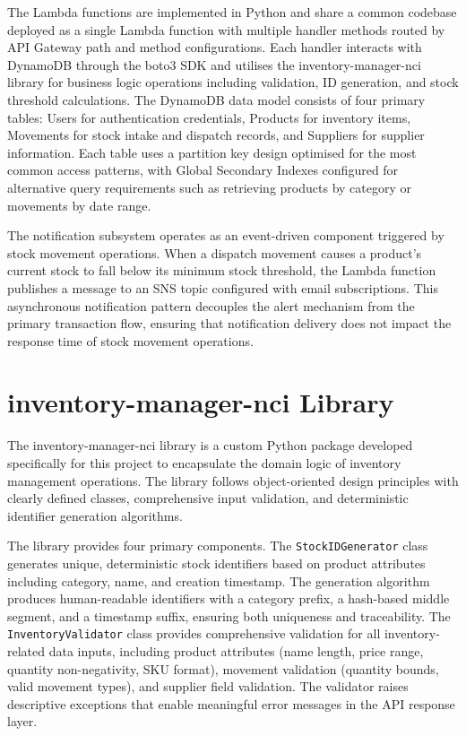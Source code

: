 \documentclass[conference]{IEEEtran}
\begin{document}
The Lambda functions are implemented in Python and share a common codebase deployed as a single Lambda function with multiple handler methods routed by API Gateway path and method configurations. Each handler interacts with DynamoDB through the boto3 SDK and utilises the inventory-manager-nci library for business logic operations including validation, ID generation, and stock threshold calculations. The DynamoDB data model consists of four primary tables: Users for authentication credentials, Products for inventory items, Movements for stock intake and dispatch records, and Suppliers for supplier information. Each table uses a partition key design optimised for the most common access patterns, with Global Secondary Indexes configured for alternative query requirements such as retrieving products by category or movements by date range.

The notification subsystem operates as an event-driven component triggered by stock movement operations. When a dispatch movement causes a product's current stock to fall below its minimum stock threshold, the Lambda function publishes a message to an SNS topic configured with email subscriptions. This asynchronous notification pattern decouples the alert mechanism from the primary transaction flow, ensuring that notification delivery does not impact the response time of stock movement operations.

\section{inventory-manager-nci Library}

The inventory-manager-nci library is a custom Python package developed specifically for this project to encapsulate the domain logic of inventory management operations. The library follows object-oriented design principles with clearly defined classes, comprehensive input validation, and deterministic identifier generation algorithms.

The library provides four primary components. The \texttt{StockIDGenerator} class generates unique, deterministic stock identifiers based on product attributes including category, name, and creation timestamp. The generation algorithm produces human-readable identifiers with a category prefix, a hash-based middle segment, and a timestamp suffix, ensuring both uniqueness and traceability. The \texttt{InventoryValidator} class provides comprehensive validation for all inventory-related data inputs, including product attributes (name length, price range, quantity non-negativity, SKU format), movement validation (quantity bounds, valid movement types), and supplier field validation. The validator raises descriptive exceptions that enable meaningful error messages in the API response layer.
\end{document}
